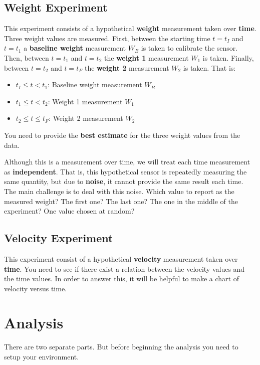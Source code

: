 \subsection{Weight Experiment}
This experiment consists of a hypothetical \textbf{weight} measurement taken over \textbf{time}. Three weight values are measured. First, between the starting time $t = t_{I}$ and $t = t_{1}$ a \textbf{baseline weight} measurement $W_{B}$ is taken to calibrate the sensor. Then, between $t = t_{1}$ and $t = t_{2}$ the \textbf{weight 1} measurement $W_{1}$ is taken. Finally, between $t = t_{2}$ and $t = t_{F}$ the \textbf{weight 2} measurement $W_{2}$ is taken. That is:
\begin{itemize}
    \item $t_{I} \leq t < t_{1}$: Baseline weight measurement $W_{B}$
    \item $t_{1} \leq t < t_{2}$: Weight 1 measurement $W_{1}$
    \item $t_{2} \leq t \leq t_{F}$: Weight 2 measurement $W_{2}$
\end{itemize}
You need to provide the \textbf{best estimate} for the three weight values from the data.

Although this is a measurement over time, we will treat each time measurement as \textbf{independent}. That is, this hypothetical sensor is repeatedly measuring the same quantity, but due to \textbf{noise}, it cannot provide the same result each time. The main challenge is to deal with this noise. Which value to report as the measured weight? The first one? The last one? The one in the middle of the experiment? One value chosen at random?
\subsection{Velocity Experiment}
This experiment consist of a hypothetical \textbf{velocity} measurement taken over \textbf{time}. You need to see if there exist a relation between the velocity values and the time values. In order to answer this, it will be helpful to make a chart of velocity versus time.
\section{Analysis}
There are two separate parts. But before beginning the analysis you need to setup your environment.
